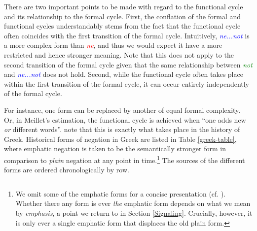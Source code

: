 \documentclass[linguex]{sp}
\theoremstyle{definition} \newtheorem{definition}{Definition}
\begin{document}
There are two important points to be made with regard to the functional cycle and its relationship to the formal cycle. First, the conflation of the formal and functional cycles understandably stems from the fact that the functional cycle often coincides with the first transition of the formal cycle.  Intuitively, \emph{\textcolor{blue}{ne...not}} is a more complex form than  \emph{\textcolor{red}{ne}}, and thus we would expect it have a more restricted and hence stronger meaning. Note that this does not apply to the second transition of the formal cycle given that the same relationship between \emph{\textcolor{green}{not}} and \emph{\textcolor{blue}{ne...not}} does not hold.  Second, while the functional cycle often takes place within the first transition of the formal cycle, it can occur entirely independently of the formal cycle.  

For instance, one form can be replaced by another of equal formal complexity.  Or, in Meillet's \citeyearpar[134]{meillet1912} estimation, the functional cycle is achieved when ``one adds  new \emph{or} different words''.  \cite{kiparsky-condoravdi:2006} note that this is exactly what takes place in the history of Greek. Historical forms of negation in Greek are listed in Table \ref{greek-table}, where emphatic negation is taken to be the semantically stronger form in comparison to \emph{plain} negation at any point in time.\footnote{We omit some of the emphatic forms for a concise presentation (cf. \citealt[1]{kiparsky-condoravdi:2006}). Whether there any form is ever  \emph{the} emphatic form depends on what we mean by \emph{emphasis}, a point we return to in Section \ref{Signaling}. Crucially, however, it is only ever a single emphatic form that displaces the old plain form.} The sources of the different forms are ordered chronologically by row.
\end{document}
